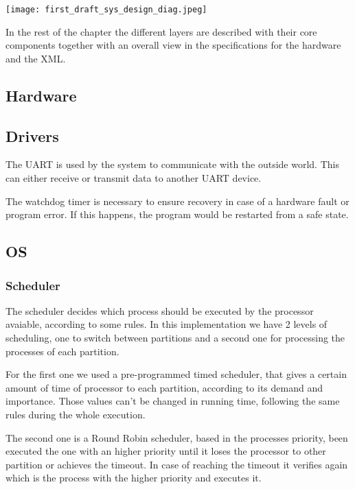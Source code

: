 \texttt{[image: first\_draft\_sys\_design\_diag.jpeg]}

In the rest of the chapter the different layers are described with their core
components together with an overall view in the specifications for the hardware
and the XML.


\subsection{Hardware}

\subsection{Drivers}
\begin{description}[align=left]
	\item [\textbf{UART driver}] The UART is used by the system to communicate with the outside
	world. This can either receive or transmit data to another UART device.
	\item [\textbf{Watchdog timer driver}] The watchdog timer is necessary to ensure recovery
	in case of a hardware fault or program error. If this happens, the program would be restarted
	from a safe state.

\end{description}

\subsection{OS}
\subsubsection{Scheduler}
The scheduler decides which process should be executed by the processor avaiable, according to some rules. In this implementation we have 2 levels of scheduling, one to switch between partitions and a second one for processing the processes of each partition.

For the first one we used a pre-programmed timed scheduler, that gives a certain amount of time of processor to each partition, according to its demand and importance. Those values can't be changed in running time, following the same rules during the whole execution.

The second one is a Round Robin scheduler, based in the processes priority, been executed the one with an higher priority until it loses the processor to other partition or achieves the timeout. In case of reaching the timeout it verifies again which is the process with the higher priority and executes it.

